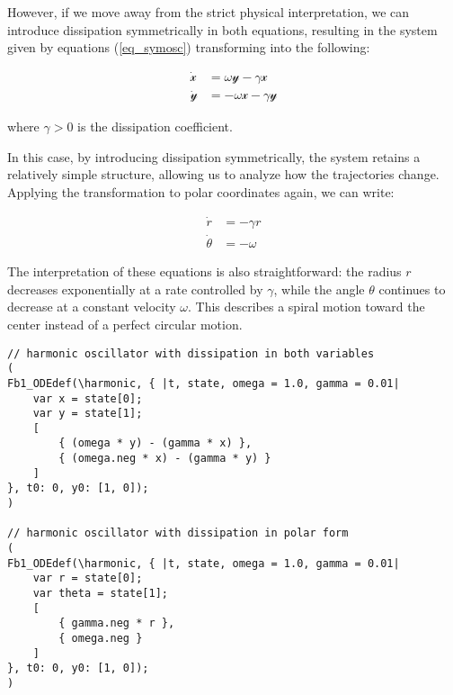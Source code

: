 \documentclass{article}
\begin{document}
However, if we move away from the strict physical interpretation, we can introduce dissipation symmetrically in both equations, resulting in the system given by equations (\ref{eq_symosc}) transforming into the following:

\begin{subequations} \label{eq_symosc_diss}
\begin{align}
    \dot{\mathscr{x}} & = \omega\mathscr{y} - \gamma\mathscr{x} \\
    \dot{\mathscr{y}} & = -\omega\mathscr{x} - \gamma\mathscr{y}
\end{align}
\end{subequations}

where $\gamma > 0$ is the dissipation coefficient.

In this case, by introducing dissipation symmetrically, the system retains a relatively simple structure, allowing us to analyze how the trajectories change. Applying the transformation to polar coordinates again, we can write:

\begin{subequations} \label{eq_symosc_diss_polar}
\begin{align}
    \dot{r} & = -\gamma r \\
    \dot{\theta} & = -\omega 
\end{align}
\end{subequations}

The interpretation of these equations is also straightforward: the radius $r$ decreases exponentially at a rate controlled by $\gamma$, while the angle $\theta$ continues to decrease at a constant velocity $\omega$. This describes a spiral motion toward the center instead of a perfect circular motion.


\begin{lstlisting}[caption=The symmetric oscillator and the oscillation on the circle.]
// harmonic oscillator with dissipation in both variables
(
Fb1_ODEdef(\harmonic, { |t, state, omega = 1.0, gamma = 0.01|
	var x = state[0];
	var y = state[1];
	[
		{ (omega * y) - (gamma * x) },
		{ (omega.neg * x) - (gamma * y) }
	]
}, t0: 0, y0: [1, 0]);
)

// harmonic oscillator with dissipation in polar form
(
Fb1_ODEdef(\harmonic, { |t, state, omega = 1.0, gamma = 0.01|
	var r = state[0];
	var theta = state[1];
	[
		{ gamma.neg * r },
		{ omega.neg }
	]
}, t0: 0, y0: [1, 0]);
)

\end{lstlisting}
\end{document}
